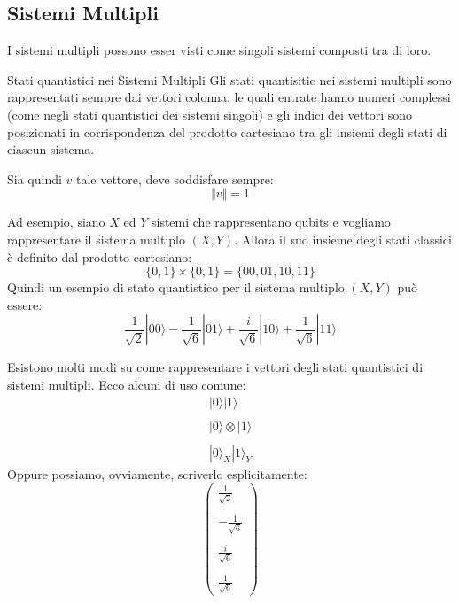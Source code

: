 \subsection{Sistemi Multipli}
I sistemi multipli possono esser visti come singoli sistemi composti tra di loro.
\begin{definition}{Stati quantistici nei Sistemi Multipli}{}
Gli stati quantisitic nei sistemi multipli sono rappresentati sempre dai vettori colonna, le quali entrate hanno numeri complessi (come negli stati quantistici dei sistemi singoli) e gli indici dei vettori sono posizionati in corrispondenza del prodotto cartesiano tra gli insiemi degli stati di ciascun sistema.

Sia quindi $v$ tale vettore, deve soddisfare sempre:
\begin{equation*}
    \Vert v \Vert = 1
\end{equation*}
\end{definition}
\begin{example}{}{}
    Ad esempio, siano $X$ ed $Y$ sistemi che rappresentano qubits e vogliamo rappresentare il sistema multiplo $(X,Y)$. Allora il suo insieme degli stati classici è definito dal prodotto cartesiano:
    \begin{equation*}
        \{0,1\} \times \{0,1\} = \{00,01,10,11\}
    \end{equation*}
    Quindi un esempio di stato quantistico per il sistema multiplo $(X,Y)$ può essere:
    \begin{equation*}
        \frac{1}{\sqrt{2}}|00\rangle - \frac{1}{\sqrt{6}}|01\rangle + \frac{i}{\sqrt{6}}|10\rangle + \frac{1}{\sqrt{6}}|11\rangle
    \end{equation*}
\end{example}
Esistono molti modi su come rappresentare i vettori degli stati quantistici di sistemi multipli. Ecco alcuni di uso comune:
 \begin{equation*}
    \begin{array}{l}
        |0\rangle |1\rangle \\ \\
        |0\rangle \otimes|1\rangle \\ \\
        |0\rangle_X|1\rangle_Y
    \end{array}
\end{equation*}
Oppure possiamo, ovviamente, scriverlo esplicitamente:
\begin{equation*}
    \left(\begin{array}{c}
         \frac{1}{\sqrt{2}}  \\ \\
         - \frac{1}{\sqrt{6}} \\ \\
         \frac{i}{\sqrt{6}} \\ \\
         \frac{1}{\sqrt{6}}
    \end{array}\right)
\end{equation*}
